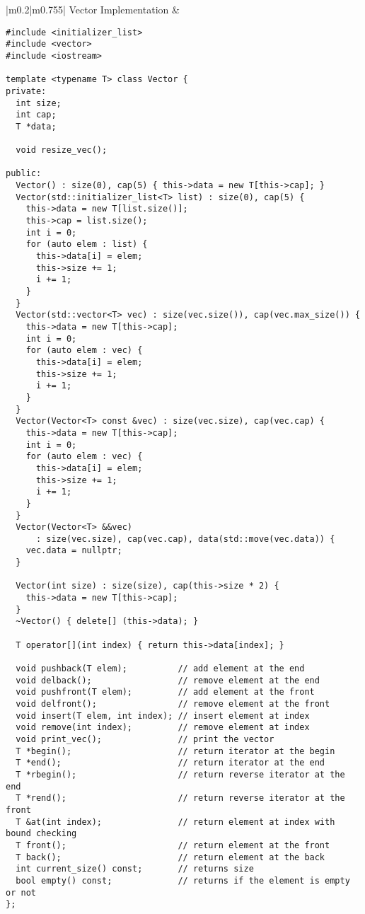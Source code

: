 \documentclass[main.tex,fontsize=8pt,paper=a4,paper=portrait,DIV=calc]{scrartcl}
\begin{document}
\begin{table}[ht!]
\begin{tabular}{|m{0.2\linewidth}|m{0.755\linewidth}|}
\hline
Vector Implementation & 
\vspace{2mm}
\begin{lstlisting}
#include <initializer_list>
#include <vector>
#include <iostream>

template <typename T> class Vector {
private:
  int size;
  int cap;
  T *data;

  void resize_vec();

public:
  Vector() : size(0), cap(5) { this->data = new T[this->cap]; }
  Vector(std::initializer_list<T> list) : size(0), cap(5) {
    this->data = new T[list.size()];
    this->cap = list.size();
    int i = 0;
    for (auto elem : list) {
      this->data[i] = elem;
      this->size += 1;
      i += 1;
    }
  }
  Vector(std::vector<T> vec) : size(vec.size()), cap(vec.max_size()) {
    this->data = new T[this->cap];
    int i = 0;
    for (auto elem : vec) {
      this->data[i] = elem;
      this->size += 1;
      i += 1;
    }
  }
  Vector(Vector<T> const &vec) : size(vec.size), cap(vec.cap) {
    this->data = new T[this->cap];
    int i = 0;
    for (auto elem : vec) {
      this->data[i] = elem;
      this->size += 1;
      i += 1;
    }
  }
  Vector(Vector<T> &&vec)
      : size(vec.size), cap(vec.cap), data(std::move(vec.data)) {
    vec.data = nullptr;
  }

  Vector(int size) : size(size), cap(this->size * 2) {
    this->data = new T[this->cap];
  }
  ~Vector() { delete[] (this->data); }

  T operator[](int index) { return this->data[index]; }

  void pushback(T elem);          // add element at the end
  void delback();                 // remove element at the end
  void pushfront(T elem);         // add element at the front
  void delfront();                // remove element at the front
  void insert(T elem, int index); // insert element at index
  void remove(int index);         // remove element at index
  void print_vec();               // print the vector
  T *begin();                     // return iterator at the begin
  T *end();                       // return iterator at the end
  T *rbegin();                    // return reverse iterator at the end
  T *rend();                      // return reverse iterator at the front
  T &at(int index);               // return element at index with bound checking
  T front();                      // return element at the front
  T back();                       // return element at the back
  int current_size() const;       // returns size
  bool empty() const;             // returns if the element is empty or not
};


\end{lstlisting}
\end{tabular}
\end{table}
\end{document}
